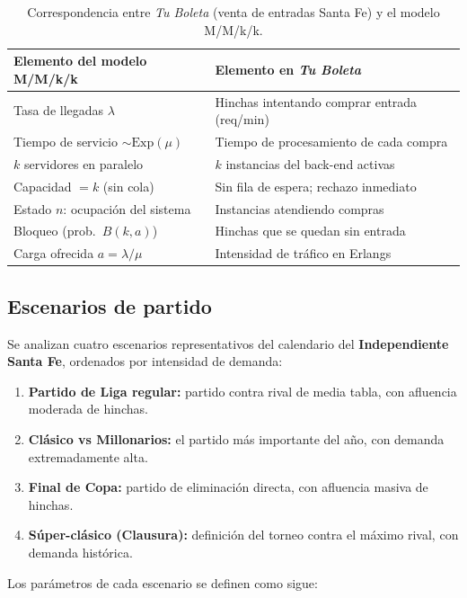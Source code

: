 \begin{table}[H]
\centering
\caption{Correspondencia entre \emph{Tu Boleta} (venta de entradas Santa Fe) y el modelo M/M/k/k.}
\label{tab:analogia_tuboleta}
\begin{tabular}{ll}
\toprule
\textbf{Elemento del modelo M/M/k/k} & \textbf{Elemento en \emph{Tu Boleta}} \\
\midrule
Tasa de llegadas $\lambda$ & Hinchas intentando comprar entrada (req/min) \\
Tiempo de servicio $\sim \mathrm{Exp}(\mu)$ & Tiempo de procesamiento de cada compra \\
$k$ servidores en paralelo & $k$ instancias del back-end activas \\
Capacidad $=k$ (sin cola) & Sin fila de espera; rechazo inmediato \\
Estado $n$: ocupación del sistema & Instancias atendiendo compras \\
Bloqueo (prob.\ $B(k,a)$) & Hinchas que se quedan sin entrada \\
Carga ofrecida $a=\lambda/\mu$ & Intensidad de tráfico en Erlangs \\
\bottomrule
\end{tabular}
\end{table}

\subsection*{Escenarios de partido}

Se analizan cuatro escenarios representativos del calendario del
\textbf{Independiente Santa Fe}, ordenados por intensidad de demanda:

\begin{enumerate}
    \item \textbf{Partido de Liga regular:} partido contra rival de media tabla,
          con afluencia moderada de hinchas.
    \item \textbf{Clásico vs Millonarios:} el partido más importante del año,
          con demanda extremadamente alta.
    \item \textbf{Final de Copa:} partido de eliminación directa, con afluencia
          masiva de hinchas.
    \item \textbf{Súper-clásico (Clausura):} definición del torneo contra el
          máximo rival, con demanda histórica.
\end{enumerate}

Los parámetros de cada escenario se definen como sigue:

